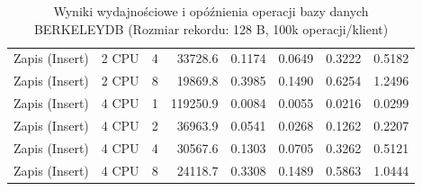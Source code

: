 \begin{table}[ht]
{\begin{tabular}{llcrrrrr}
Zapis (Insert) & 2 CPU & 4 & 33728.6 & 0.1174 & 0.0649 & 0.3222 & 0.5182 \\
Zapis (Insert) & 2 CPU & 8 & 19869.8 & 0.3985 & 0.1490 & 0.6254 & 1.2496 \\
Zapis (Insert) & 4 CPU & 1 & 119250.9 & 0.0084 & 0.0055 & 0.0216 & 0.0299 \\
Zapis (Insert) & 4 CPU & 2 & 36963.9 & 0.0541 & 0.0268 & 0.1262 & 0.2207 \\
Zapis (Insert) & 4 CPU & 4 & 30567.6 & 0.1303 & 0.0705 & 0.3262 & 0.5121 \\
Zapis (Insert) & 4 CPU & 8 & 24118.7 & 0.3308 & 0.1489 & 0.5863 & 1.0444 \\
\bottomrule
\end{tabular}%
}
\caption{Wyniki wydajnościowe i opóźnienia operacji bazy danych BERKELEYDB (Rozmiar rekordu: 128 B, 100k operacji/klient)}
\label{tab:latency_berkeleydb_small_100000}
\end{table}
